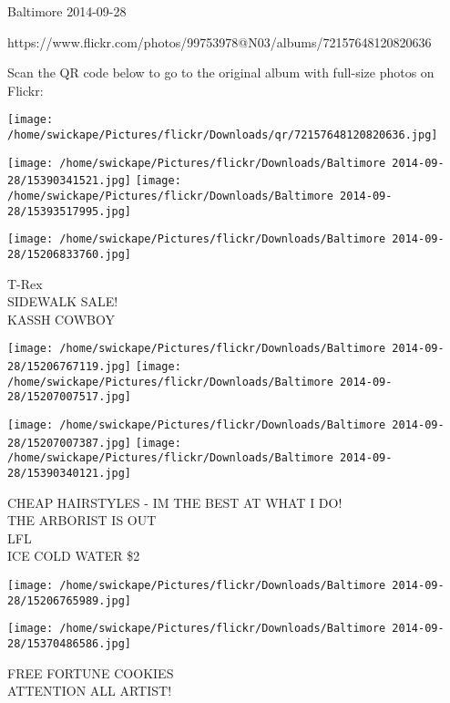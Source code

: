 \documentclass[10pt,letterpaper]{article}
\begin{document}
Baltimore 2014-09-28

https://www.flickr.com/photos/99753978@N03/albums/72157648120820636

Scan the QR code below to go to the original album with full-size photos on Flickr:

\texttt{[image: /home/swickape/Pictures/flickr/Downloads/qr/72157648120820636.jpg]}
\pagebreak

\texttt{[image: /home/swickape/Pictures/flickr/Downloads/Baltimore 2014-09-28/15390341521.jpg]}
\texttt{[image: /home/swickape/Pictures/flickr/Downloads/Baltimore 2014-09-28/15393517995.jpg]}

\vspace{0.25in}
\texttt{[image: /home/swickape/Pictures/flickr/Downloads/Baltimore 2014-09-28/15206833760.jpg]}

T{-}Rex\\
SIDEWALK SALE!\\
KASSH COWBOY\\
\pagebreak

\texttt{[image: /home/swickape/Pictures/flickr/Downloads/Baltimore 2014-09-28/15206767119.jpg]}
\texttt{[image: /home/swickape/Pictures/flickr/Downloads/Baltimore 2014-09-28/15207007517.jpg]}

\texttt{[image: /home/swickape/Pictures/flickr/Downloads/Baltimore 2014-09-28/15207007387.jpg]}
\texttt{[image: /home/swickape/Pictures/flickr/Downloads/Baltimore 2014-09-28/15390340121.jpg]}

CHEAP HAIRSTYLES {-} IM THE BEST AT WHAT I DO!\\
THE ARBORIST IS OUT\\
LFL\\
ICE COLD WATER \$2\\
\pagebreak

\texttt{[image: /home/swickape/Pictures/flickr/Downloads/Baltimore 2014-09-28/15206765989.jpg]}

\vspace{0.25in}
\texttt{[image: /home/swickape/Pictures/flickr/Downloads/Baltimore 2014-09-28/15370486586.jpg]}

FREE FORTUNE COOKIES\\
ATTENTION ALL ARTIST!\\
\pagebreak
\end{document}

